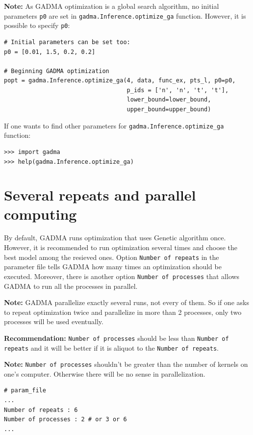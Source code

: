 \documentclass[12pt]{article}
\makeatletter
\newcommand{\py}[1]{\lstinline[language=Python, showstringspaces=False]@#1@}
\makeatother
\begin{document}
\textbf{Note:} As GADMA optimization is a global search algorithm, no initial parameters \py{p0} are set in \py{gadma.Inference.optimize_ga} function. However, it is possible to specify \py{p0}:
\begin{lstlisting}
# Initial parameters can be set too:
p0 = [0.01, 1.5, 0.2, 0.2]

# Beginning GADMA optimization
popt = gadma.Inference.optimize_ga(4, data, func_ex, pts_l, p0=p0, 
                                   p_ids = ['n', 'n', 't', 't'],
                                   lower_bound=lower_bound,
                                   upper_bound=upper_bound)
\end{lstlisting}
If one wants to find other parameters for \py{gadma.Inference.optimize_ga} function:

\begin{lstlisting}
>>> import gadma
>>> help(gadma.Inference.optimize_ga)
\end{lstlisting}

\section{Several repeats and parallel computing}

By default, GADMA runs optimization that uses Genetic algorithm once. However, it is recommended to run optimization several times and choose the best model among the resieved ones. Option \py{Number of repeats} in the parameter file tells GADMA how many times an optimization should be executed. Moreover, there is another option \py{Number of processes} that allows GADMA to run all the processes in parallel. 

\textbf{Note:} GADMA parallelize exactly several runs, not every of them. So if one asks to repeat optimization twice and parallelize in more than 2 processes, only two processes will be used eventually. 

\textbf{Recommendation:} \py{Number of processes} should be less than \py{Number of repeats} and it will be better if it is aliquot to the \py{Number of repeats}.

\textbf{Note:} \py{Number of processes} shouldn't be greater than the number of kernels on one's computer. Otherwise there will be no sense in parallelization.

\begin{lstlisting}
# param_file
...
Number of repeats : 6
Number of processes : 2 # or 3 or 6
...
\end{lstlisting}
\end{document}

